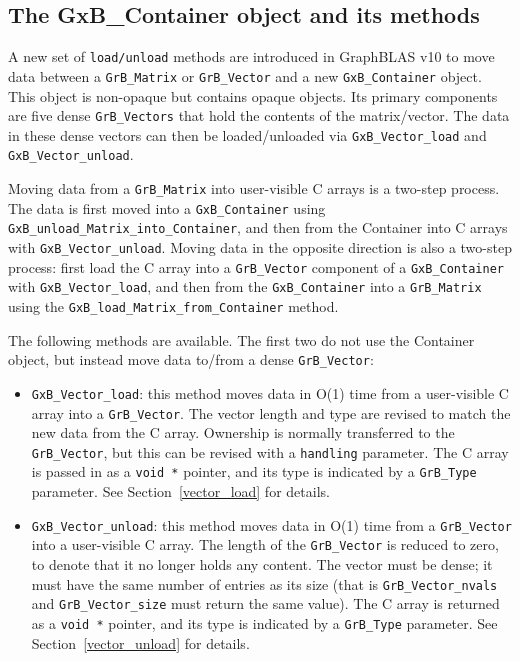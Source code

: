 \newpage
\subsection{The GxB\_Container object and its methods}
\label{container}

A new set of \verb'load/unload' methods are introduced in GraphBLAS v10 to move
data between a \verb'GrB_Matrix' or \verb'GrB_Vector' and a new
\verb'GxB_Container' object.  This object is non-opaque but contains opaque
objects.  Its primary components are five dense \verb'GrB_Vectors' that hold
the contents of the matrix/vector.  The data in these dense vectors can then be
loaded/unloaded via \verb'GxB_Vector_load' and \verb'GxB_Vector_unload'.

Moving data from a \verb'GrB_Matrix' into user-visible C arrays is a two-step
process.  The data is first moved into a \verb'GxB_Container' using \newline
\verb'GxB_unload_Matrix_into_Container', and then from the Container into C
arrays with \verb'GxB_Vector_unload'.  Moving data in the opposite direction is
also a two-step process: first load the C array into a \verb'GrB_Vector'
component of a \verb'GxB_Container' with \verb'GxB_Vector_load', and then from
the \verb'GxB_Container' into a \verb'GrB_Matrix' using the
\verb'GxB_load_Matrix_from_Container' method.

The following methods are available.  The first two do not use the
Container object, but instead move data to/from a dense \verb'GrB_Vector':

\begin{itemize}

\item \verb'GxB_Vector_load':  this method moves data in O(1) time from a
    user-visible C array into a \verb'GrB_Vector'.  The vector length and type
    are revised to match the new data from the C array.  Ownership is normally
    transferred to the \verb'GrB_Vector', but this can be revised with a
    \verb'handling' parameter.  The C array is passed in as a \verb'void *'
    pointer, and its type is indicated by a \verb'GrB_Type' parameter.  See
    Section~\ref{vector_load} for details.

\item \verb'GxB_Vector_unload': this method moves data in O(1) time from a
    \verb'GrB_Vector' into a user-visible C array.  The length of the
    \verb'GrB_Vector' is reduced to zero, to denote that it no longer holds any
    content.  The vector must be dense; it must have the same number of entries
    as its size (that is \verb'GrB_Vector_nvals' and \verb'GrB_Vector_size'
    must return the same value).  The C array is returned as a \verb'void *'
    pointer, and its type is indicated by a \verb'GrB_Type' parameter.  See
    Section~\ref{vector_unload} for details.

\end{itemize}

